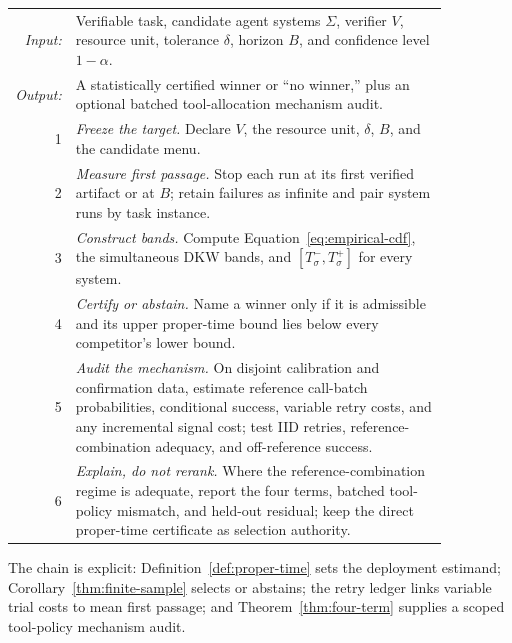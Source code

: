 \begin{algorithm}
\label{alg:pick-model}
\begin{tabular}{@{}r p{0.86\linewidth}@{}}
\textit{Input:} &
Verifiable task, candidate agent systems \(\Sigma\), verifier \(V\),
resource unit, tolerance \(\delta\), horizon \(B\),
and confidence level \(1-\alpha\).\\[0.25em]
\textit{Output:} &
A statistically certified winner or ``no winner,'' plus an optional batched
tool-allocation mechanism audit.\\[0.35em]
1 & \textit{Freeze the target.} Declare \(V\), the resource unit, \(\delta\),
\(B\), and the candidate menu.\\
2 & \textit{Measure first passage.} Stop each run at its first verified artifact
or at \(B\); retain failures as infinite and pair system runs by task instance.\\
3 & \textit{Construct bands.} Compute Equation~\eqref{eq:empirical-cdf}, the
simultaneous DKW bands, and \([T_\sigma^-,T_\sigma^+]\) for every system.\\
4 & \textit{Certify or abstain.} Name a winner only if it is admissible and its
upper proper-time bound lies below every competitor's lower bound.\\
5 & \textit{Audit the mechanism.} On disjoint calibration and confirmation data,
estimate reference call-batch probabilities, conditional success, variable
retry costs, and any incremental signal cost; test IID retries,
reference-combination adequacy, and off-reference success.\\
6 & \textit{Explain, do not rerank.} Where the reference-combination regime is
adequate, report the four terms, batched tool-policy mismatch, and held-out
residual; keep the direct proper-time certificate as selection authority.
\end{tabular}
\end{algorithm}

The chain is explicit: Definition~\ref{def:proper-time} sets the deployment
estimand; Corollary~\ref{thm:finite-sample} selects or abstains;
the retry ledger links variable trial costs to mean first passage; and
Theorem~\ref{thm:four-term} supplies a scoped tool-policy
mechanism audit.
\label{sec:theory-end}
